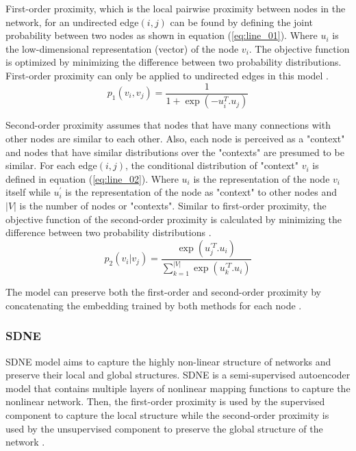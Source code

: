 First-order proximity, which is the local pairwise proximity between nodes in the network, for an undirected edge$(i,j)$ can be found by defining the joint probability between two nodes as shown in equation (\ref{eq:line_01}). Where $u_{i}$ is the low-dimensional representation (vector) of the node $v_{i}$. The objective function is optimized by minimizing the difference between two probability distributions. First-order proximity can only be applied to undirected edges in this model \cite{tang_line:_2015}.
\begin{equation} \label{eq:line_01}
p_{1}(v_{i}, v_{j}) = \frac{1}{1+ \exp{(-u_{i}^T .u_{j})}}
\end{equation}

Second-order proximity assumes that nodes that have many connections with other nodes are similar to each other. Also, each node is perceived as a "context" and nodes that have similar distributions over the "contexts" are presumed to be similar. For each edge$(i,j)$, the conditional distribution of "context" $v_{i}$ is defined in equation (\ref{eq:line_02}). Where $u_{i}$ is the representation of the node $v_{i}$ itself while $u_{i}^{'}$ is the representation of the node as "context" to other nodes and $|V|$ is the number of nodes or "contexts". Similar to first-order proximity, the objective function of the second-order proximity is calculated by minimizing the difference between two probability distributions \cite{tang_line:_2015}.
\begin{equation} \label{eq:line_02}
p_{2}(v_{i}| v_{j}) = \frac{\exp(u_{j}^{'T} .u_{i})}{\sum_{k=1}^{|V|} \exp{(u_{k}^{'T} .u_{i})}}
\end{equation}

The model can preserve both the first-order and second-order proximity by concatenating the embedding trained by both methods for each node \cite{tang_line:_2015}.

\subsubsection{SDNE}
\label{subsection:SDNE}
\ac{SDNE} model aims to capture the highly non-linear structure of networks and preserve their local and global structures. \ac{SDNE} is a semi-supervised autoencoder model that contains multiple layers of nonlinear mapping functions to capture the nonlinear network. Then, the first-order proximity is used by the supervised component to capture the local structure while the second-order proximity is used by the unsupervised component to preserve the global structure of the network \cite{wang_structural_2016}. 

